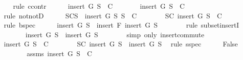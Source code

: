 \begin{isabellebody}
\ \ \isamarkupfalse%
\ {\isacharparenleft}rule\ ccontr{\isacharparenright}\isanewline
\ \ \ \ \isamarkupfalse%
\ {\isachardoublequoteopen}{\isasymnot}{\isacharparenleft}insert\ G\ {\isacharquery}S{}\ {\isasymnotin}\ C{\isacharparenright}{\isachardoublequoteclose}\isanewline
\ \ \ \ \isamarkupfalse%
\ \isamarkupfalse%
\ {\isachardoublequoteopen}insert\ G\ {\isacharquery}S{}\ {\isasymin}\ C{\isachardoublequoteclose}\isanewline
\ \ \ \ \ \ \isamarkupfalse%
\ {\isacharparenleft}rule\ notnotD{\isacharparenright}\isanewline
\ \ \ \ \isamarkupfalse%
\ SC{}{\isacharcolon}{\isachardoublequoteopen}{\isasymforall}S{\isacharprime}\ {\isasymsubseteq}\ {\isacharparenleft}insert\ G\ {\isacharquery}S{}{\isacharparenright}{\isachardot}\ S{\isacharprime}\ {\isasymin}\ C{\isachardoublequoteclose}\isanewline
\ \ \ \ \ \ \isamarkupfalse%
\ SC\ {\isacartoucheopen}insert\ G\ {\isacharquery}S{}\ {\isasymin}\ C{\isacartoucheclose}\ \isamarkupfalse%
\ {\isacharparenleft}rule\ bspec{\isacharparenright}\isanewline
\ \ \ \ \isamarkupfalse%
\ {\isachardoublequoteopen}insert\ G\ S{}\ {\isasymsubseteq}\ insert\ F\ {\isacharparenleft}insert\ G\ S{}{\isacharparenright}{\isachardoublequoteclose}\isanewline
\ \ \ \ \ \ \isamarkupfalse%
\ {\isacharparenleft}rule\ subset{\isacharunderscore}insertI{\isacharparenright}\isanewline
\ \ \ \ \isamarkupfalse%
\ \isamarkupfalse%
\ {\isachardoublequoteopen}insert\ G\ S{}\ {\isasymsubseteq}\ insert\ G\ {\isacharquery}S{}{\isachardoublequoteclose}\isanewline
\ \ \ \ \ \ \isamarkupfalse%
\ {\isacharparenleft}simp\ only{\isacharcolon}\ insert{\isacharunderscore}commute{\isacharparenright}\isanewline
\ \ \ \ \isamarkupfalse%
\ {\isachardoublequoteopen}insert\ G\ S{}\ {\isasymin}\ C{\isachardoublequoteclose}\isanewline
\ \ \ \ \ \ \isamarkupfalse%
\ SC{}\ {\isacartoucheopen}insert\ G\ S{}\ {\isasymsubseteq}\ insert\ G\ {\isacharquery}S{}{\isacartoucheclose}\ \isamarkupfalse%
\ {\isacharparenleft}rule\ sspec{\isacharparenright}\isanewline
\ \ \ \ \isamarkupfalse%
\ {\isachardoublequoteopen}False{\isachardoublequoteclose}\isanewline
\ \ \ \ \ \ \isamarkupfalse%
\ assms{\isacharparenleft}{}{\isacharparenright}\ {\isacartoucheopen}insert\ G\ S{}\ {\isasymin}\ C{\isacartoucheclose}\ \isamarkupfalse%

\end{isabellebody}

